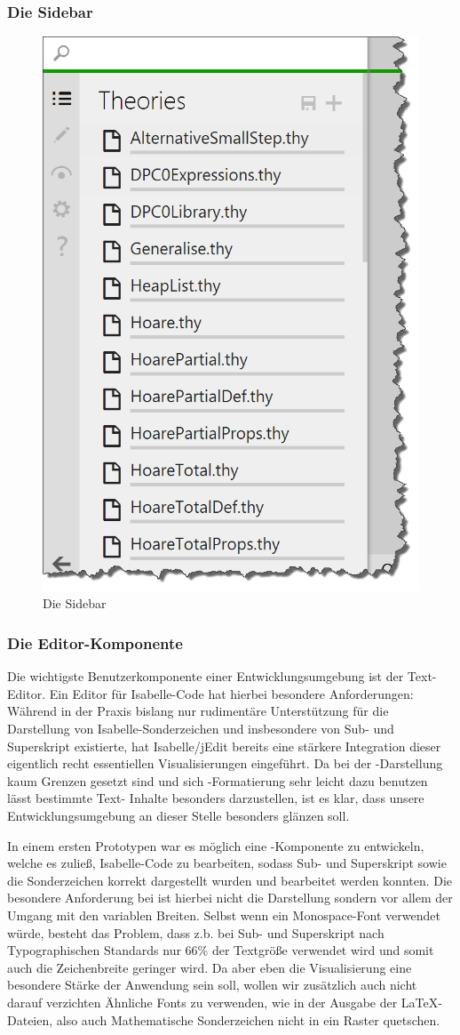 \subsubsection{Die Sidebar}

\begin{figure}[ht]
\centering
\includegraphics[width=0.4\linewidth]{images/screen-sidebar}
  \caption{Die Sidebar}
  \label{fig:screen-sidebar}
\end{figure}

\subsubsection{Die Editor-Komponente}

Die wichtigste Benutzerkomponente einer Entwicklungsumgebung ist der Text-Editor. Ein Editor für
Isabelle-Code hat hierbei besondere Anforderungen: Während in der Praxis bislang nur rudimentäre
Unterstützung für die Darstellung von Isabelle-Sonderzeichen und insbesondere von Sub- und
Superskript existierte, hat Isabelle/jEdit bereits eine stärkere Integration dieser eigentlich recht
essentiellen Visualisierungen eingeführt. \cite{iscala} Da bei der -Darstellung kaum
Grenzen gesetzt sind und sich -Formatierung sehr leicht dazu benutzen lässt bestimmte Text-
Inhalte besonders darzustellen, ist es klar, dass unsere Entwicklungsumgebung an dieser Stelle
besonders glänzen soll.

In einem ersten Prototypen war es möglich eine -Komponente zu entwickeln, welche es zuließ,
Isabelle-Code zu bearbeiten, sodass Sub- und Superskript sowie die Sonderzeichen korrekt dargestellt
wurden und bearbeitet werden konnten. Die besondere Anforderung bei ist hierbei nicht die
Darstellung sondern vor allem der Umgang mit den variablen Breiten. Selbst wenn ein Monospace-Font
verwendet würde, besteht das Problem, dass z.b. bei Sub- und Superskript nach Typographischen
Standards nur 66\% der Textgröße verwendet wird und somit auch die Zeichenbreite geringer wird. Da
aber eben die Visualisierung eine besondere Stärke der Anwendung sein soll, wollen wir zusätzlich
auch nicht darauf verzichten Ähnliche Fonts zu verwenden, wie in der Ausgabe der LaTeX-Dateien, also
auch Mathematische Sonderzeichen nicht in ein Raster quetschen. 

